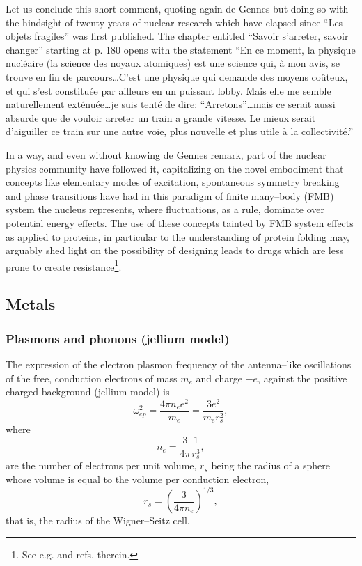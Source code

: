 \begin{subappendices}
 Let us conclude this short comment, quoting again de Gennes but doing so with the hindsight of twenty years of nuclear research which have elapsed since ``Les objets fragiles'' was first published. The chapter entitled  ``Savoir s'arreter, savoir changer'' starting at p. 180 opens with the statement ``En ce moment, la physique nucl\'eaire (la science des noyaux atomiques) est une science qui, \`a mon avis, se trouve en fin de parcours\dots C'est une physique qui demande des moyens co\^uteux, et qui s'est constitu\'ee par ailleurs en un puissant lobby. Mais elle me semble naturellement ext\'enu\'ee\dots je suis tent\'e de dire: ``Arretons''\dots mais ce serait aussi absurde que de vouloir arreter un train a grande vitesse. Le mieux serait d'aiguiller ce train sur une autre voie, plus nouvelle et plus utile \`a la collectivit\'e.''


In a way, and even without knowing de Gennes remark, part of the nuclear physics community have followed it, capitalizing on the novel embodiment that concepts like elementary modes of excitation, spontaneous symmetry breaking and phase transitions have had in this paradigm of finite many--body (FMB) system the nucleus represents, where fluctuations, as a rule, dominate over potential energy effects. The use of these concepts tainted by  FMB system effects as applied to proteins, in particular to the understanding of protein folding may, arguably shed light on the possibility of designing leads to  drugs which are less prone to create resistance\footnote{See e.g. \cite{Broglia:13b,Broglia:05} and refs. therein.}.




\subsection{Metals}
\subsubsection{Plasmons and phonons (jellium model)}
The expression of the electron plasmon frequency of the antenna--like oscillations of the free, conduction electrons of mass $m_e$ and charge $-e$, against the positive charged background (jellium model) is
\begin{equation}\label{eq3.A.33}
\omega_{ep}^2=\frac{4\pi n_e e^2}{m_e}=\frac{3e^2}{m_er_s^2},
\end{equation}
where 
\begin{equation}
n_e=\frac{3}{4\pi}\frac{1}{r_s^3},
\end{equation}
are the number of electrons per unit volume, $r_s$ being the radius of a sphere whose volume is equal to the volume per conduction electron,
\begin{equation}
r_s=\left(\frac{3}{4\pi n_e}\right)^{1/3},
\end{equation}
that is, the radius of the Wigner--Seitz cell.



\end{subappendices}
